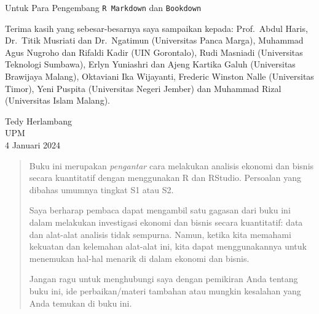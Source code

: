 \documentclass[a4paper, nobind]{templates/ociamthesis}
\begin{document}
\begin{romanpages}

\maketitle

\begin{dedication}
  Untuk Para Pengembang \texttt{R\ Markdown} dan \texttt{Bookdown}
\end{dedication}



\begin{acknowledgements}
 	Terima kasih yang sebesar-besarnya saya sampaikan kepada: Prof.~Abdul Haris, Dr.~Titik Musriati dan Dr.~Ngatimun (Universitas Panca Marga), Muhammad Agus Nugroho dan Rifaldi Kadir (UIN Gorontalo), Rudi Masniadi (Universitas Teknologi Sumbawa), Erlyn Yuniashri dan Ajeng Kartika Galuh (Universitas Brawijaya Malang), Oktaviani Ika Wijayanti, Frederic Winston Nalle (Universitas Timor), Yeni Puspita (Universitas Negeri Jember) dan Muhammad Rizal (Universitas Islam Malang).

 \begin{flushright}
 Tedy Herlambang \\
 UPM \\
 4 Januari 2024
 \end{flushright}
\end{acknowledgements}





\renewcommand{\abstracttitle}{Sinopsis}
\begin{abstract}
	Buku ini merupakan \emph{pengantar} cara melakukan analisis ekonomi dan bisnis secara kuantitatif dengan menggunakan R dan RStudio. Persoalan yang dibahas umumnya tingkat S1 atau S2.

Saya berharap pembaca dapat mengambil satu gagasan dari buku ini dalam melakukan investigasi ekonomi dan bisnis secara kuantitatif: data dan alat-alat analisis tidak sempurna. Namun, ketika kita memahami kekuatan dan kelemahan alat-alat ini, kita dapat menggunakannya untuk menemukan hal-hal menarik di dalam ekonomi dan bisnis.

Jangan ragu untuk menghubungi saya dengan pemikiran Anda tentang buku ini, ide perbaikan/materi tambahan atau mungkin kesalahan yang Anda temukan di buku ini.
\end{abstract}




\end{romanpages}
\end{document}
